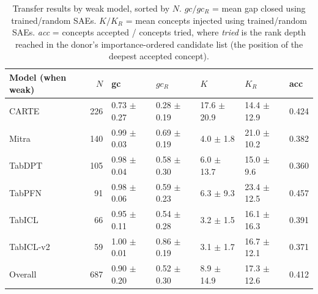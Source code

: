 \begin{table}[h]
\centering
\small
\caption{Transfer results by weak model, sorted by $N$. $gc/gc_R$ = mean gap closed using trained/random SAEs. $K/K_R$ = mean concepts injected using trained/random SAEs. \emph{acc} = concepts accepted / concepts tried, where \emph{tried} is the rank depth reached in the donor's importance-ordered candidate list (the position of the deepest accepted concept).}
\label{tab:transfer_summary}
\begin{tabular}{lrlllll}
\toprule
Model (when weak) & $N$ & gc & $gc_R$ & $K$ & $K_R$ & acc \\
\midrule
CARTE & 226 & 0.73 $\pm$ 0.27 & 0.28 $\pm$ 0.19 & 17.6 $\pm$ 20.9 & 14.4 $\pm$ 12.9 & 0.424 \\
Mitra & 140 & 0.99 $\pm$ 0.03 & 0.69 $\pm$ 0.19 & 4.0 $\pm$ 1.8 & 21.0 $\pm$ 10.2 & 0.382 \\
TabDPT & 105 & 0.98 $\pm$ 0.04 & 0.58 $\pm$ 0.30 & 6.0 $\pm$ 13.7 & 15.0 $\pm$ 9.6 & 0.360 \\
TabPFN & 91 & 0.98 $\pm$ 0.06 & 0.59 $\pm$ 0.23 & 6.3 $\pm$ 9.3 & 23.4 $\pm$ 12.5 & 0.457 \\
TabICL & 66 & 0.95 $\pm$ 0.11 & 0.54 $\pm$ 0.28 & 3.2 $\pm$ 1.5 & 16.1 $\pm$ 16.3 & 0.391 \\
TabICL-v2 & 59 & 1.00 $\pm$ 0.01 & 0.86 $\pm$ 0.19 & 3.1 $\pm$ 1.7 & 16.7 $\pm$ 12.1 & 0.371 \\
\midrule
Overall & 687 & 0.90 $\pm$ 0.20 & 0.52 $\pm$ 0.30 & 8.9 $\pm$ 14.9 & 17.3 $\pm$ 12.6 & 0.412 \\
\bottomrule
\end{tabular}
\end{table}
